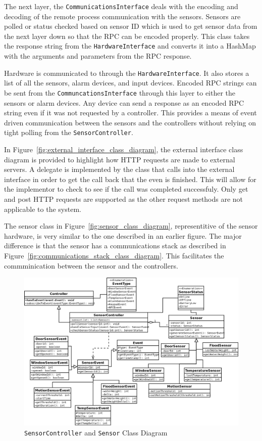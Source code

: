 \documentclass{report}
\begin{document}
The next layer, the \texttt{CommunicationsInterface} deals with the encoding
and decoding of the remote process communication with the sensors. Sensors are
polled or status checked based on sensor ID which is used to get sensor data
from the next layer down so that the RPC can be encoded properly. This class
takes the response string from the \texttt{HardwareInterface} and converts it
into a HashMap with the arguments and parameters from the RPC response.

Hardware is communicated to through the \texttt{HardwareInterface}. It also
stores a list of all the sensors, alarm devices, and input devices. Encoded RPC
strings can be sent from the \texttt{CommuncationsInterface} through this layer
to either the sensors or alarm devices. Any device can send a response as an
encoded RPC string even if it was not requested by a controller. This provides
a means of event driven communication between the sensors and the controllers
without relying on tight polling from the \texttt{SensorController}.

In Figure~\ref{fig:external_interface_class_diagram}, the external interface
class diagram is provided to highlight how HTTP requests are made to external
servers. A delegate is implemented by the class that calls into the external
interface in order to get the call back that the even is finished. This will
allow for the implementor to check to see if the call was completed
successfuly. Only get and post HTTP requests are supported as the other request
methods are not applicable to the system.

The sensor class in Figure~\ref{fig:sensor_class_diagram}, representitive of
the sensor hardware, is very similar to the one described in an earlier figure.
The major difference is that the sensor has a communications stack as described
in Figure~\ref{fig:communications_stack_class_diagram}. This facilitates the
commminication between the sensor and the controllers.
\begin{landscape} 
\begin{figure}[p]
    \caption{\texttt{SensorController} and \texttt{Sensor} Class Diagram}
    \label{fig:sensor_controller_class_diagram}
    \includegraphics[scale=0.5]{sensor_controller_class_diagram.png}
\end{figure}
\end{landscape} 
\end{document}
